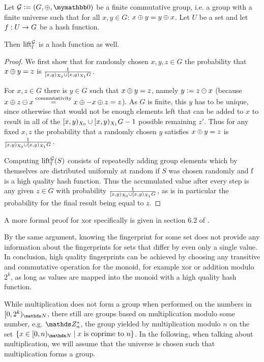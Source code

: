 \begin{proposition}
Let $\mathcal{G} \defeq (G, \groupaddsym, \neutraladd)$ be a finite commutative group, i.e. a group with a finite universe such that for all $x, y \in G$: ${x} \oplus {y} = {y} \oplus {x}$. Let $U$ be a set and let ${f}: {U} \rightarrow {G}$ be a hash function.

Then $\operatorname{lift_{\operatorname{f}}^{\mathcal{G}}}$ is a hash function as well.

\begin{proof}
We first show that for randomly chosen $x, y, z \in G$ the probability that ${x} \oplus {y} = z$ is $\frac{1}{[{x},{y})_{X_0} \cup [{x},{y})_{X_1}{G}}$.

For $x, z \in G$ there is $y \in G$ such that ${x} \oplus {y} = z$, namely $y \vcentcolon= {z} \ominus {x}$ (because ${x} \oplus {{z} \ominus {x}} \overset{\text{commutativity}}= {{x} \oplus {-{x}}} \oplus {z} = z$). As $G$ is finite, this $y$ has to be unique, since otherwise that would not be enough elements left that can be added to $x$ to result in all of the $[{x},{y})_{X_0} \cup [{x},{y})_{X_1}{G} - 1$ possible remaining $z'$. Thus for any fixed $x, z$ the probability that a randomly chosen $y$ satisfies ${x} \oplus {y} = z$ is $\frac{1}{[{x},{y})_{X_0} \cup [{x},{y})_{X_1}{G}}$.

Computing $\operatorname{lift_{\operatorname{f}}^{\mathcal{G}}}(S)$ consists of repeatedly adding group elements which by themselves are distributed uniformly at random if $S$ was chosen randomly and $\operatorname{f}$ is a high quality hash function. Thus the accumulated value after every step is any given $z \in G$ with probability $\frac{1}{[{x},{y})_{X_0} \cup [{x},{y})_{X_1}{G}}$, as is in particular the probability for the final result being equal to $z$.
\end{proof}

A more formal proof for xor specifically is given in section 6.2 of \cite{maziarz2021hashing}.
\end{proposition}

By the same argument, knowing the fingerprint for some set does not provide any information about the fingerprints for sets that differ by even only a single value. In conclusion, high quality fingerprints can be achieved by choosing any transitive and commutative operation for the monoid, for example xor or addition modulo $2^k$, as long as values are mapped into the monoid with a high quality hash function.

While multiplication does not form a group when performed on the numbers in $\interval{0}{2^k}{\N}$, there still are groups based on multiplication modulo some number, e.g. $\Z_n^\ast$, the group yielded by multiplication modulo $n$ on the set $\set{x \in \interval{0}{n}{\N} \mid \text{$x$ is coprime to $n$}}$. In the following, when talking about multiplication, we will assume that the universe is chosen such that multiplication forms a group.

